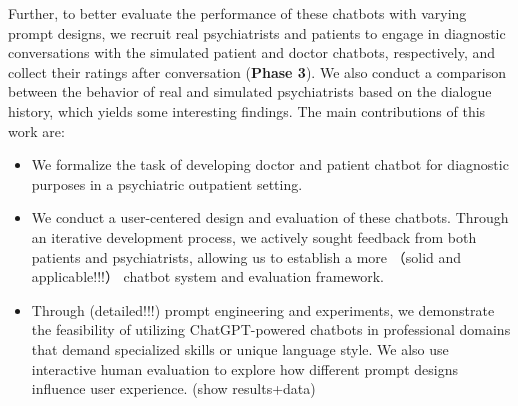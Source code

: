 Further, to better evaluate the performance of these chatbots with varying prompt designs, we recruit real psychiatrists and patients to engage in diagnostic conversations with the simulated patient and doctor chatbots, respectively, and collect their ratings after conversation (\textbf{Phase 3}). We also conduct a comparison between the behavior of real and simulated psychiatrists based on the dialogue history, which yields some interesting findings. 
The main contributions of this work are:
\begin{itemize}
    \item We formalize the task of developing doctor and patient chatbot for diagnostic purposes in a psychiatric outpatient setting.
    \item We conduct a user-centered design and evaluation of these chatbots. Through an iterative development process, we actively sought feedback from both patients and psychiatrists, allowing us to establish a more （solid and applicable!!!） chatbot system and evaluation framework. 
    \item Through (detailed!!!) prompt engineering and experiments, we demonstrate the feasibility of utilizing ChatGPT-powered chatbots in professional domains that demand specialized skills or unique language style. We also use interactive human evaluation to explore how different prompt designs influence user experience. (show results+data) %
\end{itemize}





